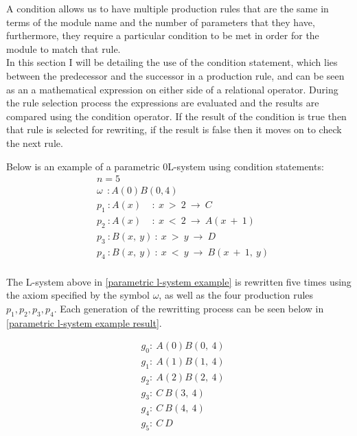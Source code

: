 \begin{flushleft}

A condition allows us to have multiple production rules that are the same in terms of the module name and the number of parameters that they have, furthermore, they require a particular condition to be met in order for the module to match that rule. \\
In this section I will be detailing the use of the condition statement, which lies between the predecessor and the successor in a production rule, and can be seen as an a mathematical expression on either side of a relational operator. During the rule selection process the expressions are evaluated and the results are compared using the condition operator. If the result of the condition is true then that rule is selected for rewriting, if the result is false then it moves on to check the next rule. \\

\vspace{5mm}

Below is an example of a parametric 0L-system using condition statements:\\

\begin{equation} \label{parametric l-system example}
\begin{aligned}
	&n=5 \\
	&\omega~~ : A(0)B(0,4)\\
	&p_1~ :  A(x)~~~~~ :~ x~ >~ 2~ \rightarrow~ C\\
	&p_2~ :  A(x)~~~~~ :~ x~ <~ 2~ \rightarrow~ A(x~ +~ 1)\\
	&p_3~ :  B(x,~ y)~ :~ x~ >~ y~ \rightarrow~ D\\
	&p_4~ :  B(x,~ y)~ :~ x~ <~ y~ \rightarrow~ B(x~ +~ 1,~ y)\\
\end{aligned}
\end{equation}

\vspace{5mm}

The L-system above in \ref{parametric l-system example} is rewritten five times using the axiom specified by the symbol $\omega$, as well as the four production rules $p_1, p_2, p_3, p_4$. Each generation of the rewritting process can be seen below in \ref{parametric l-system example result}.

\vspace{5mm}

\begin{equation} \label{parametric l-system example result}
\begin{aligned}
	&g_0 :~ A(0)B(0,~4)\\
	&g_1 :~ A(1)B(1,~4)\\
	&g_2 :~ A(2)B(2,~4)\\
	&g_3 :~ C~B(3,~4)\\
	&g_4 :~ C~B(4,~4)\\
	&g_5 :~ C~D\\
\end{aligned}
\end{equation}


\end{flushleft}
